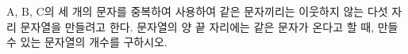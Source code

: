 \hspace*{2mm}\begin{minipage}[t]{\dimexpr\linewidth-2mm\relax}\vspace{0pt}
$\mathrm{A}$, $\mathrm{B}$, $\mathrm{C}$의 세 개의 문자를 중복하여 사용하여 같은 문자끼리는 이웃하지 않는 다섯 자리 문자열을 만들려고 한다. 문자열의 양 끝 자리에는 같은 문자가 온다고 할 때, 만들 수 있는 문자열의 개수를 구하시오.\end{minipage}

